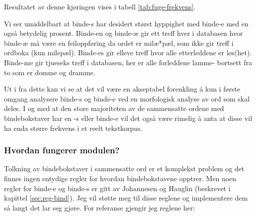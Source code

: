 Resultatet av denne kjøringen vises i tabell \ref{tab:fuge-frekvens}.


Vi ser umiddelbart at binde-s har desidert størst hyppighet med binde-e med en også betydelig prosent. Binde-en og binde-æ gir ett treff hver i databasen hvor binde-æ må være en feiloppføring da ordet er milæ*pæl, som ikke gir treff i ordboka (kun milepæl). Binde-es gir elleve treff hvor alle etterleddene er løs(het). Binde-me gir tjueseks treff i databasen, her er alle forleddene lamme- bortsett fra to som er domme og dramme.

Ut i fra dette kan vi se at det vil være en akseptabel forenkling å kun i første omgang analysere binde-s og binde-e ved en morfologisk analyse av ord som skal deles. I og med at den store majoriteten av de sammensatte ordene med bindebokstaver har en -s eller binde-e vil det også være rimelig å anta at disse vil ha enda større frekvens i et reelt tekstkorpus.

\subsubsection{Hvordan fungerer modulen?}

Tolkning av bindebokstaver i sammensatte ord er et komplekst problem og det finnes ingen entydige regler for hvordan bindebokstavene opptrer. Men noen regler for binde-e og binde-s er gitt av Johannesen og Hauglin \cite{johannessen1996automatic} (beskrevet i kapittel \ref{sec:reg-bind}). Jeg vil støtte meg til disse reglene og implementere dem så langt det lar seg gjøre. For referanse gjengir jeg reglene her:

